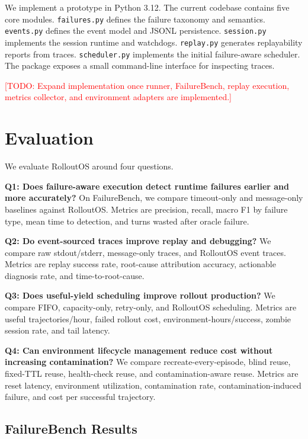 \documentclass{article}
\newcommand{\sys}{RolloutOS}
\newcommand{\todo}[1]{\textcolor{red}{[TODO: #1]}}
\begin{document}
We implement a prototype in Python 3.12.
The current codebase contains five core modules.
\texttt{failures.py} defines the failure taxonomy and semantics.
\texttt{events.py} defines the event model and JSONL persistence.
\texttt{session.py} implements the session runtime and watchdogs.
\texttt{replay.py} generates replayability reports from traces.
\texttt{scheduler.py} implements the initial failure-aware scheduler.
The package exposes a small command-line interface for inspecting traces.

\todo{Expand implementation once runner, FailureBench, replay execution, metrics collector, and environment adapters are implemented.}

\section{Evaluation}
\label{sec:evaluation}

We evaluate \sys{} around four questions.

\textbf{Q1: Does failure-aware execution detect runtime failures earlier and more accurately?}
On FailureBench, we compare timeout-only and message-only baselines against \sys{}.
Metrics are precision, recall, macro F1 by failure type, mean time to detection, and turns wasted after oracle failure.

\textbf{Q2: Do event-sourced traces improve replay and debugging?}
We compare raw stdout/stderr, message-only traces, and \sys{} event traces.
Metrics are replay success rate, root-cause attribution accuracy, actionable diagnosis rate, and time-to-root-cause.

\textbf{Q3: Does useful-yield scheduling improve rollout production?}
We compare FIFO, capacity-only, retry-only, and \sys{} scheduling.
Metrics are useful trajectories/hour, failed rollout cost, environment-hours/success, zombie session rate, and tail latency.

\textbf{Q4: Can environment lifecycle management reduce cost without increasing contamination?}
We compare recreate-every-episode, blind reuse, fixed-TTL reuse, health-check reuse, and contamination-aware reuse.
Metrics are reset latency, environment utilization, contamination rate, contamination-induced failure, and cost per successful trajectory.

\subsection{FailureBench Results}
\end{document}
